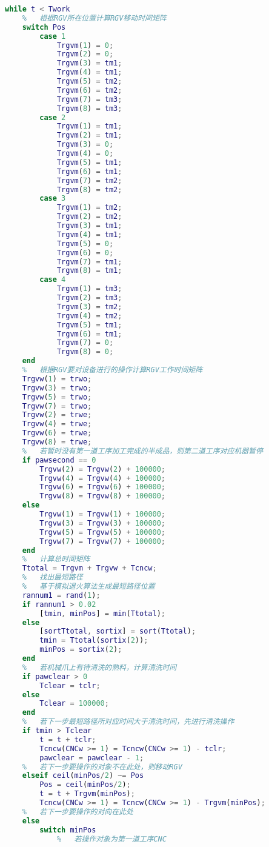 \documentclass[no-math,withoutpreface,bwprint]{cumcmthesis} %
\numberwithin{equation}{section}
\numberwithin{figure}{section}
\numberwithin{table}{section}
\begin{document}
\begin{lstlisting}[language=matlab]
while t < Twork
    %   根据RGV所在位置计算RGV移动时间矩阵
    switch Pos
        case 1
            Trgvm(1) = 0;
          	Trgvm(2) = 0;
            Trgvm(3) = tm1;
           	Trgvm(4) = tm1;
         	Trgvm(5) = tm2;
           	Trgvm(6) = tm2;
          	Trgvm(7) = tm3;
           	Trgvm(8) = tm3;
       	case 2
           	Trgvm(1) = tm1;
           	Trgvm(2) = tm1;
         	Trgvm(3) = 0;
          	Trgvm(4) = 0;
           	Trgvm(5) = tm1;
          	Trgvm(6) = tm1;
           	Trgvm(7) = tm2;
           	Trgvm(8) = tm2;               
        case 3
           	Trgvm(1) = tm2;
          	Trgvm(2) = tm2;
          	Trgvm(3) = tm1;
         	Trgvm(4) = tm1;
          	Trgvm(5) = 0;
           	Trgvm(6) = 0;
          	Trgvm(7) = tm1;
           	Trgvm(8) = tm1;
     	case 4
         	Trgvm(1) = tm3;
          	Trgvm(2) = tm3;
           	Trgvm(3) = tm2;
          	Trgvm(4) = tm2;
           	Trgvm(5) = tm1;
          	Trgvm(6) = tm1;
        	Trgvm(7) = 0;
           	Trgvm(8) = 0;        
    end
    %   根据RGV要对设备进行的操作计算RGV工作时间矩阵
    Trgvw(1) = trwo;
	Trgvw(3) = trwo;
    Trgvw(5) = trwo;
	Trgvw(7) = trwo;
	Trgvw(2) = trwe;
	Trgvw(4) = trwe;
	Trgvw(6) = trwe;
	Trgvw(8) = trwe;
    %   若暂时没有第一道工序加工完成的半成品，则第二道工序对应机器暂停
    if pawsecond == 0
        Trgvw(2) = Trgvw(2) + 100000;
        Trgvw(4) = Trgvw(4) + 100000;
        Trgvw(6) = Trgvw(6) + 100000;
        Trgvw(8) = Trgvw(8) + 100000;
    else
        Trgvw(1) = Trgvw(1) + 100000;
        Trgvw(3) = Trgvw(3) + 100000;
        Trgvw(5) = Trgvw(5) + 100000;
        Trgvw(7) = Trgvw(7) + 100000;
    end
    %   计算总时间矩阵
    Ttotal = Trgvm + Trgvw + Tcncw;
    %   找出最短路径
    %   基于模拟退火算法生成最短路径位置
    rannum1 = rand(1);
    if rannum1 > 0.02
        [tmin, minPos] = min(Ttotal);
    else
        [sortTtotal, sortix] = sort(Ttotal);
        tmin = Ttotal(sortix(2));
        minPos = sortix(2);
    end
    %   若机械爪上有待清洗的熟料，计算清洗时间
    if pawclear > 0
        Tclear = tclr;
    else
        Tclear = 100000;
    end
    %   若下一步最短路径所对应时间大于清洗时间，先进行清洗操作
    if tmin > Tclear
        t = t + tclr;
        Tcncw(CNCw >= 1) = Tcncw(CNCw >= 1) - tclr;
        pawclear = pawclear - 1;
    %   若下一步要操作的对象不在此处，则移动RGV
    elseif ceil(minPos/2) ~= Pos
        Pos = ceil(minPos/2);
        t = t + Trgvm(minPos);
        Tcncw(CNCw >= 1) = Tcncw(CNCw >= 1) - Trgvm(minPos);
    %   若下一步要操作的对向在此处
    else
        switch minPos
            %   若操作对象为第一道工序CNC

\end{lstlisting}
\end{document}
